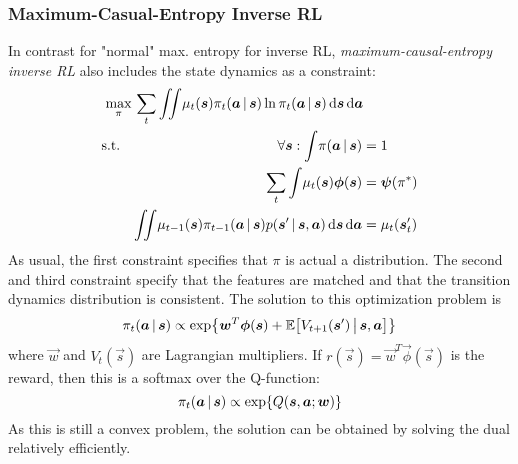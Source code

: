 			\subsubsection{Maximum-Casual-Entropy Inverse RL}
				In contrast for "normal" max. entropy for inverse RL, \emph{maximum-causal-entropy inverse RL} also includes the state dynamics as a constraint:
				\begin{equation*}
					\begin{aligned}
						\max_\pi \,         & \sum_t \iint\! \mu_t(\bm{s}) \pi_t(\bm{a} \,\vert\, \bm{s}) \ln \pi_t(\bm{a} \,\vert\, \bm{s}) \dd{\bm{s}} \dd{\bm{a}} \\
						\mathrm{s.t.} \quad &
						\begin{aligned}[t]
							\forall \bm{s} : \int\! \pi(\bm{a} \,\vert\, \bm{s})                                                                           & = 1                    \\
							\sum_t \int\! \mu_t(\bm{s}) \bm{\phi}(\bm{s})                                                                               & = \bm{\psi}(\pi^\ast) \\
							\iint\! \mu_{t - 1}(\bm{s}) \pi_{t - 1}(\bm{a} \,\vert\, \bm{s}) p(\bm{s}' \,\vert\, \bm{s}, \bm{a}) \dd{\bm{s}} \dd{\bm{a}} & = \mu_t(\bm{s}_t')
						\end{aligned}
					\end{aligned}
				\end{equation*}
				As usual, the first constraint specifies that \(\pi\) is actual a distribution. The second and third constraint specify that the features are matched and that the transition dynamics distribution is consistent. The solution to this optimization problem is
				\begin{equation*}
					\pi_t(\bm{a} \,\vert\, \bm{s}) \propto \exp{ \bm{w}^T \bm{\phi}(\bm{s}) + \mathbb{E}\big[ V_{t + 1}(\bm{s}') \,\big\vert\,\bm{s}, \bm{a} \big] }
				\end{equation*}
				where \( \vec{w} \) and \( V_t(\vec{s}) \) are Lagrangian multipliers. If \( r(\vec{s}) = \vec{w}^T \vec{\phi}(\vec{s}) \) is the reward, then this is a softmax over the Q-function:
				\begin{equation*}
					\pi_t(\bm{a} \,\vert\, \bm{s}) \propto \exp{ Q(\bm{s}, \bm{a}; \bm{w}) }
				\end{equation*}
				As this is still a convex problem, the solution can be obtained by solving the dual relatively efficiently.

